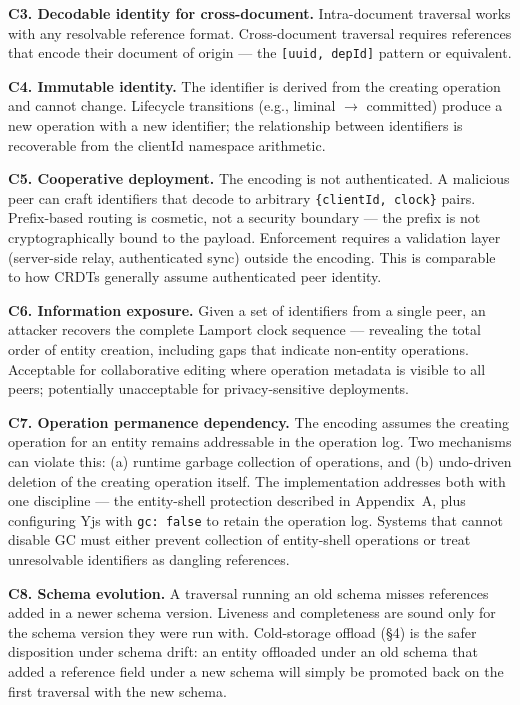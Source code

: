 \textbf{C3. Decodable identity for cross-document.} Intra-document traversal works with any resolvable reference format. Cross-document traversal requires references that encode their document of origin --- the \texttt{[uuid, depId]} pattern or equivalent.

\textbf{C4. Immutable identity.} The identifier is derived from the creating operation and cannot change. Lifecycle transitions (e.g., liminal $\rightarrow$ committed) produce a new operation with a new identifier; the relationship between identifiers is recoverable from the clientId namespace arithmetic.

\textbf{C5. Cooperative deployment.} The encoding is not authenticated. A malicious peer can craft identifiers that decode to arbitrary \texttt{\{clientId, clock\}} pairs. Prefix-based routing is cosmetic, not a security boundary --- the prefix is not cryptographically bound to the payload. Enforcement requires a validation layer (server-side relay, authenticated sync) outside the encoding. This is comparable to how CRDTs generally assume authenticated peer identity.

\textbf{C6. Information exposure.} Given a set of identifiers from a single peer, an attacker recovers the complete Lamport clock sequence --- revealing the total order of entity creation, including gaps that indicate non-entity operations. Acceptable for collaborative editing where operation metadata is visible to all peers; potentially unacceptable for privacy-sensitive deployments.

\textbf{C7. Operation permanence dependency.} The encoding assumes the creating operation for an entity remains addressable in the operation log. Two mechanisms can violate this: (a) runtime garbage collection of operations, and (b) undo-driven deletion of the creating operation itself. The implementation addresses both with one discipline --- the entity-shell protection described in Appendix~A, plus configuring Yjs with \texttt{gc: false} to retain the operation log. Systems that cannot disable GC must either prevent collection of entity-shell operations or treat unresolvable identifiers as dangling references.

\textbf{C8. Schema evolution.} A traversal running an old schema misses references added in a newer schema version. Liveness and completeness are sound only for the schema version they were run with. Cold-storage offload (\S4) is the safer disposition under schema drift: an entity offloaded under an old schema that added a reference field under a new schema will simply be promoted back on the first traversal with the new schema.

